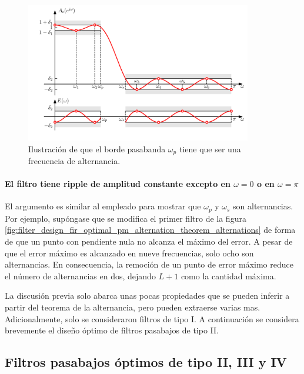 \documentclass[a4paper]{report}
\begin{document}
\begin{figure}[!htb]
 \begin{center}
 \includegraphics[width=0.88\textwidth]{figuras/filter_design_fir_optimal_pm_alternation_theorem_properties.pdf}
 \caption{\label{fig:filter_design_fir_optimal_pm_alternation_theorem_properties} Ilustración de que el borde pasabanda \(\omega_p\) tiene que ser una frecuencia de alternancia.}
 \end{center}
\end{figure}

\paragraph{El filtro tiene ripple de amplitud constante excepto en \(\omega=0\) o en \(\omega=\pi\)} El argumento es similar al empleado para mostrar que \(\omega_p\) y \(\omega_s\) son alternancias. Por ejemplo, supóngase que se modifica el primer filtro de la figura \ref{fig:filter_design_fir_optimal_pm_alternation_theorem_alternations} de forma de que un punto con pendiente nula no alcanza el máximo del error. A pesar de que el error máximo es alcanzado en nueve frecuencias, solo ocho son alternancias. En consecuencia, la remoción de un punto de error máximo reduce el número de alternancias en dos, dejando \(L+1\) como la cantidad máxima.

La discusión previa solo abarca unas pocas propiedades que se pueden inferir a partir del teorema de la alternancia, pero pueden extraerse varias mas. Adicionalmente, solo se consideraron filtros de tipo I. A continuación se considera brevemente el diseño óptimo de filtros pasabajos de tipo II.

\subsection{Filtros pasabajos óptimos de tipo II, III y IV}
\end{document}
